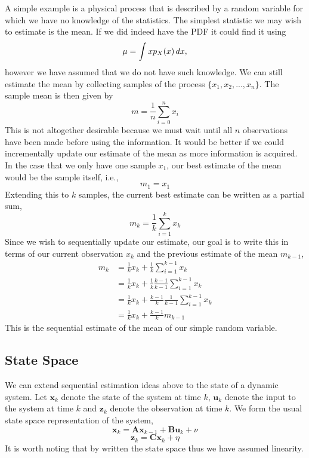 \documentclass[11pt]{article}
\begin{document}
A simple example is a physical process that is described by a random variable
for which we have no knowledge of the statistics. The simplest statistic we may
wish to estimate is the mean. If we did indeed have the PDF it could find it
using
\begin{equation} \label{eq:someequation}
\mu = \int{xp_{X}(x)\textrm\,{d}x},
\end{equation}
however we have assumed that we do not have such knowledge. We can still
estimate the mean by collecting samples of the process $\{x_{1}, x_{2}, ... ,
x_{n}\}$. The sample mean is then given by
\begin{equation}
m = \frac{1}{n}\sum\limits_{i = 0}^{n}{x_{i}}
\end{equation}
This is not altogether desirable because we must wait until all $n$ observations
have been made before using the information. It would be better if we could
incrementally update our estimate of the mean as more information is acquired.
In the case that we only have one sample $x_{1}$, our best estimate of the mean
would be the sample itself, i.e.,
\begin{equation*}
m_{1} = x_{1}
\end{equation*}
Extending this to $k$ samples, the current best estimate can be written as a
partial sum,
\begin{equation}
m_{k} = \frac{1}{k}\sum\limits_{i = 1}^k{x_{k}}
\end{equation}
Since we wish to sequentially update our estimate, our goal is to write this
in terms of our current observation $x_{k}$ and the previous estimate of the
mean $m_{k-1}$,
\begin{align*}
m_{k} &= \frac{1}{k}x_{k} + \frac{1}{k}\sum\limits_{i = 1}^{k-1}{x_{k}} \\
&= \frac{1}{k}x_{k} + \frac{1}{k}\frac{k-1}{k-1}\sum\limits_{i=1}^{k-1}{x_{k}}
\\
&= \frac{1}{k}x_{k} + \frac{k-1}{k}\frac{1}{k-1}\sum\limits_{i=1}^{k-1}{x_{k}}
\\
&= \frac{1}{k}x_{k} + \frac{k-1}{k}m_{k-1}
\end{align*}
This is the sequential estimate of the mean of our simple random variable.

\subsection{State Space}
We can extend sequential estimation ideas above to the state of a dynamic
system. Let $\mathbf{x}_{k}$ denote the state of the system at time $k$,
$\mathbf{u}_{k}$ denote the input to the system at time $k$ and
$\mathbf{z}_{k}$ denote the observation at time $k$. We form the usual state
space representation of the system,
\begin{equation}
\mathbf{x}_{k} = \mathbf{A}\mathbf{x}_{k-1} + \mathbf{B}\mathbf{u}_{k} + \nu
\end{equation}
\begin{equation}
\mathbf{z}_{k} = \mathbf{C}\mathbf{x}_{k} + \eta
\end{equation}
It is worth noting that by written the state space thus we have assumed
linearity.
\end{document}
